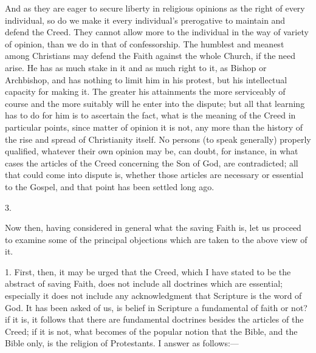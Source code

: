 And as they are eager to secure liberty in religious opinions as
the right of every individual, so do we make it every individual's
prerogative to maintain and defend the Creed. They cannot allow more
to the individual in the way of variety of opinion, than we do in that
of confessorship. The humblest and meanest among Christians may defend
the Faith against the whole Church, if the need arise. He has as much
stake in it and as much right to it, as Bishop or Archbishop, and has
nothing to limit him in his protest, but his intellectual capacity for
making it. The greater his attainments the more serviceably of course
and the more suitably will he enter into the dispute; but all that
learning has to do for him is to ascertain the fact, what is the
meaning of the Creed in particular points, since matter of opinion it
is not, any more than the history of the rise and spread of
Christianity itself. No persons (to speak generally) properly
qualified, whatever their own opinion may be, can doubt, for instance,
in what cases the articles of the Creed concerning the Son of God, are
contradicted; all that could come into dispute is, whether those
articles are necessary or essential to the Gospel, and that point has
been settled long ago.

3.

Now then, having considered in general what the saving Faith is,
let us proceed to examine some of the principal objections which are
taken to the above view of it.

1. First, then, it may be urged that the Creed, which I have stated
to be the abstract of saving Faith, does not include all doctrines
which are essential; especially it does not include any acknowledgment
that Scripture is the word of God. It has been asked of us, is belief
in Scripture a fundamental of faith or not? if it is, it follows that
there are fundamental doctrines besides the articles of the Creed; if
it is not, what becomes of the popular notion that the Bible, and the
Bible only, is the religion of Protestants. I answer as follows:—

